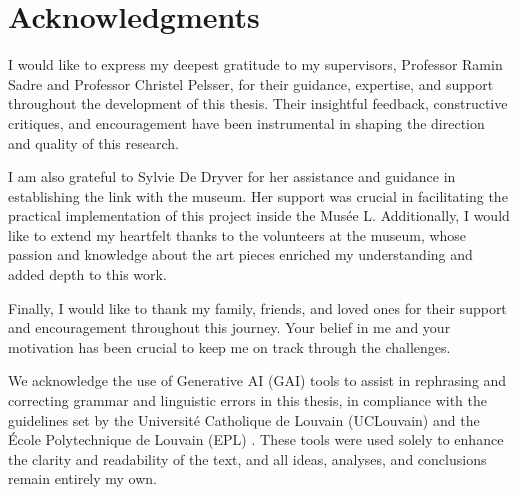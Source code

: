 \chapter*{Acknowledgments}

I would like to express my deepest gratitude to my supervisors, Professor Ramin Sadre and Professor Christel Pelsser, for their guidance, expertise, and support throughout the development of this thesis. Their insightful feedback, constructive critiques, and encouragement have been instrumental in shaping the direction and quality of this research.

I am also grateful to Sylvie De Dryver for her assistance and guidance in establishing the link with the museum. Her support was crucial in facilitating the practical implementation of this project inside the Musée L. Additionally, I would like to extend my heartfelt thanks to the volunteers at the museum, whose passion and knowledge about the art pieces enriched my understanding and added depth to this work. 

Finally, I would like to thank my family, friends, and loved ones for their support and encouragement throughout this journey. Your belief in me and your motivation has been crucial to keep me on track through the challenges.

We acknowledge the use of Generative AI (GAI) tools to assist in rephrasing and correcting grammar and linguistic errors in this thesis, in compliance with the guidelines set by the Université Catholique de Louvain (UCLouvain) \cite{gai_uclouvain} and the École Polytechnique de Louvain (EPL) \cite{gai_epl}. These tools were used solely to enhance the clarity and readability of the text, and all ideas, analyses, and conclusions remain entirely my own.